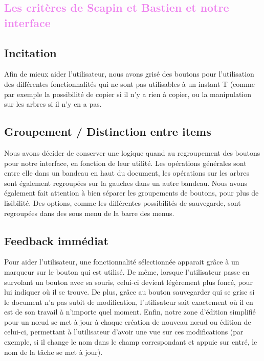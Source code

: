 \documentclass[12pt, a4paper]{article}
\begin{document}
\textcolor{Violet}{\section{Les critères de Scapin et Bastien et notre interface}}

\textcolor{NavyBlue}{\subsection{Incitation}}

Afin de mieux aider l'utilisateur, nous avons grisé des boutons pour l'utilisation des différentes fonctionnalités qui ne sont pas utilisables à un instant T (comme par exemple la possibilité de copier si il n'y a rien à copier, ou la manipulation sur les arbres si il n'y en a pas. 

\textcolor{NavyBlue}{\subsection{Groupement / Distinction entre items}}

Nous avons décider de conserver une logique quand au regroupement des boutons pour notre interface, en fonction de leur utilité. Les opérations générales sont entre elle dans un bandeau en haut du document, les opérations sur les arbres sont également regroupées sur la gauches dans un autre bandeau. Nous avons également fait attention à bien séparer les groupements de boutons, pour plus de lisibilité. Des options, comme les différentes possibilités de sauvegarde, sont regroupées dans des sous menu de la barre des menus.

\textcolor{NavyBlue}{\subsection{Feedback immédiat}}

Pour aider l'utilisateur, une fonctionnalité sélectionnée apparait grâce à un marqueur sur le bouton qui est utilisé. De même, lorsque l'utilisateur passe en survolant un bouton avec sa souris, celui-ci devient légèrement plus foncé, pour lui indiquer où il se trouve. De plus, grâce au bouton sauvegarder qui se grise si le document n'a pas subit de modification, l'utilisateur sait exactement où il en est de son travail à n'importe quel moment. Enfin, notre zone d'édition simplifié pour un nœud se met à jour à chaque création de nouveau nœud ou édition de celui-ci, permettant à l'utilisateur d'avoir une vue sur ces modifications (par exemple, si il change le nom dans le champ correspondant et appuie sur entré, le nom de la tâche se met à jour).
\end{document}
